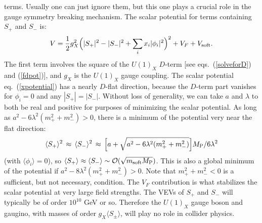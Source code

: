 \documentclass[12pt]{article}
\def\beq{\begin{eqnarray}}
\def\eeq{\end{eqnarray}}
\def\MPlanck{M_{\rm P}}
\def\Splus{S_+}
\def\Sminus{S_-}
\begin{document}
terms. Usually one can just ignore them, but this one plays a crucial role
in the gauge symmetry breaking mechanism. The scalar potential for terms
containing $\Splus$ and $\Sminus$ is: 
\beq
V =
{1\over 2} g_X^2 \Bigl ( |\Splus|^2 - |\Sminus|^2 + \sum_i x_i |\phi_i|^2
\Bigr )^2 + V_F + V_{\rm soft}.
\label{xpotential}
\eeq
The first term involves the square of the $U(1)_X$ $D$-term [see
eqs.~(\ref{solveforD}) and (\ref{fdpot})], and $g_X$ is the $U(1)_X$ gauge
coupling. The scalar potential eq.~(\ref{xpotential}) has a nearly
$D$-flat direction, because the $D$-term part vanishes for $\phi_i=0$ and
any $|\Splus| = |\Sminus|$. Without loss of generality, we can take $a$
and $\lambda$ to both be real and positive for purposes of minimizing the
scalar potential. As long as $a^2 - 6 \lambda^2 (m_+^2 + m_-^2) >
0$, there is a minimum of the potential very near the flat direction: 
\beq
\langle \Splus \rangle^2 \,\approx\, \langle \Sminus \rangle^2
\, \approx \, 
\Bigl [a + \sqrt{ a^2 - 6 \lambda^2 (m_+^2 + m_-^2) } \Bigr ]
\MPlanck/6 \lambda^2
\eeq
(with $\langle \phi_i\rangle = 0$), so $\langle \Splus \rangle \approx
\langle \Sminus \rangle \sim {\cal O}(\sqrt{m_{\rm soft} \MPlanck})$. This
is also a global minimum of the potential if $a^2 - 8 \lambda^2 (m_+^2
+ m_-^2) > 0$. Note that $m_+^2 + m_-^2 < 0$ is a sufficient,
but not necessary, condition. The $V_F$ contribution is what stabilizes
the scalar potential at very large field strengths. The VEVs of $\Splus$
and $\Sminus$ will typically be of order $10^{10}$ GeV or so. Therefore
the $U(1)_X$ gauge boson and gaugino, with masses of order $g_X \langle
S_\pm\rangle$, will play no role in collider physics. 
\end{document}
